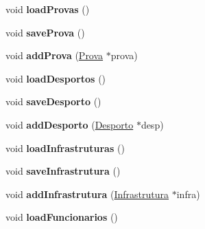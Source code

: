 \begin{DoxyCompactItemize}
\item 
\hypertarget{class_campeonato_ab5e16dc2945f8d7c8df296f6ea9bcea7}{}void {\bfseries load\+Provas} ()\label{class_campeonato_ab5e16dc2945f8d7c8df296f6ea9bcea7}

\item 
\hypertarget{class_campeonato_a218d92de18b9b220152c45cf296c642a}{}void {\bfseries save\+Prova} ()\label{class_campeonato_a218d92de18b9b220152c45cf296c642a}

\item 
\hypertarget{class_campeonato_a777ce5868c70203d5f10957ee16ff809}{}void {\bfseries add\+Prova} (\hyperlink{class_prova}{Prova} $\ast$prova)\label{class_campeonato_a777ce5868c70203d5f10957ee16ff809}

\item 
\hypertarget{class_campeonato_a7f0315c9ea9ba62140421c60e5ff5e3b}{}void {\bfseries load\+Desportos} ()\label{class_campeonato_a7f0315c9ea9ba62140421c60e5ff5e3b}

\item 
\hypertarget{class_campeonato_a1bab4414a1ef07dc98870869e89ea958}{}void {\bfseries save\+Desporto} ()\label{class_campeonato_a1bab4414a1ef07dc98870869e89ea958}

\item 
\hypertarget{class_campeonato_a868d9ddabd78de968cd48a02b25c582f}{}void {\bfseries add\+Desporto} (\hyperlink{class_desporto}{Desporto} $\ast$desp)\label{class_campeonato_a868d9ddabd78de968cd48a02b25c582f}

\item 
\hypertarget{class_campeonato_ae3836a81c3eed0f733e4e755b90b698e}{}void {\bfseries load\+Infrastruturas} ()\label{class_campeonato_ae3836a81c3eed0f733e4e755b90b698e}

\item 
\hypertarget{class_campeonato_a6cdf7ddac2a131aa092874e5661452e6}{}void {\bfseries save\+Infrastrutura} ()\label{class_campeonato_a6cdf7ddac2a131aa092874e5661452e6}

\item 
\hypertarget{class_campeonato_adad466bb56cf2f764e8bd184653059a8}{}void {\bfseries add\+Infrastrutura} (\hyperlink{class_infrastrutura}{Infrastrutura} $\ast$infra)\label{class_campeonato_adad466bb56cf2f764e8bd184653059a8}

\item 
\hypertarget{class_campeonato_a4e08ac62e5c8a7839033d141f2d33af5}{}void {\bfseries load\+Funcionarios} ()\label{class_campeonato_a4e08ac62e5c8a7839033d141f2d33af5}


\end{DoxyCompactItemize}

